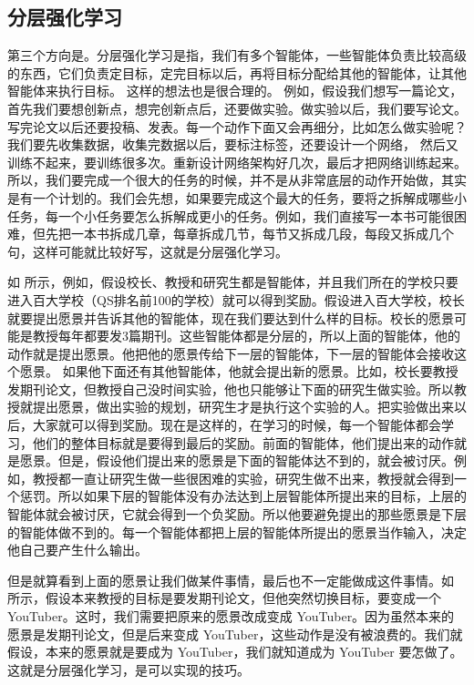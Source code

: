 \subsection{分层强化学习} 
第三个方向是。分层强化学习是指，我们有多个智能体，一些智能体负责比较高级的东西，它们负责定目标，定完目标以后，再将目标分配给其他的智能体，让其他智能体来执行目标。
这样的想法也是很合理的。
例如，假设我们想写一篇论文，首先我们要想创新点，想完创新点后，还要做实验。做实验以后，我们要写论文。写完论文以后还要投稿、发表。每一个动作下面又会再细分，比如怎么做实验呢？我们要先收集数据，收集完数据以后，要标注标签，还要设计一个网络，
然后又训练不起来，要训练很多次。重新设计网络架构好几次，最后才把网络训练起来。
所以，我们要完成一个很大的任务的时候，并不是从非常底层的动作开始做，其实是有一个计划的。我们会先想，如果要完成这个最大的任务，要将之拆解成哪些小任务，每一个小任务要怎么拆解成更小的任务。例如，我们直接写一本书可能很困难，但先把一本书拆成几章，每章拆成几节，每节又拆成几段，每段又拆成几个句，这样可能就比较好写，这就是分层强化学习。

如 所示，例如，假设校长、教授和研究生都是智能体，并且我们所在的学校只要进入百大学校（QS排名前100的学校）就可以得到奖励。假设进入百大学校，校长就要提出愿景并告诉其他的智能体，现在我们要达到什么样的目标。校长的愿景可能是教授每年都要发3篇期刊。这些智能体都是分层的，所以上面的智能体，他的动作就是提出愿景。他把他的愿景传给下一层的智能体，下一层的智能体会接收这个愿景。
如果他下面还有其他智能体，他就会提出新的愿景。比如，校长要教授发期刊论文，但教授自己没时间实验，他也只能够让下面的研究生做实验。所以教授就提出愿景，做出实验的规划，研究生才是执行这个实验的人。把实验做出来以后，大家就可以得到奖励。现在是这样的，在学习的时候，每一个智能体都会学习，他们的整体目标就是要得到最后的奖励。前面的智能体，他们提出来的动作就是愿景。但是，假设他们提出来的愿景是下面的智能体达不到的，就会被讨厌。例如，教授都一直让研究生做一些很困难的实验，研究生做不出来，教授就会得到一个惩罚。所以如果下层的智能体没有办法达到上层智能体所提出来的目标，上层的智能体就会被讨厌，它就会得到一个负奖励。所以他要避免提出的那些愿景是下层的智能体做不到的。每一个智能体都把上层的智能体所提出的愿景当作输入，决定他自己要产生什么输出。

但是就算看到上面的愿景让我们做某件事情，最后也不一定能做成这件事情。如 所示，假设本来教授的目标是要发期刊论文，但他突然切换目标，要变成一个 YouTuber。这时，我们需要把原来的愿景改成变成 YouTuber。因为虽然本来的愿景是发期刊论文，但是后来变成 YouTuber，这些动作是没有被浪费的。我们就假设，本来的愿景就是要成为 YouTuber，我们就知道成为 YouTuber 要怎做了。这就是分层强化学习，是可以实现的技巧。

